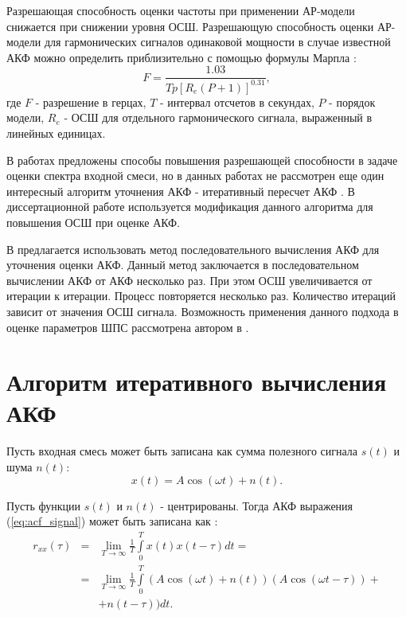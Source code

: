 Разрешающая способность оценки частоты при применении АР-модели снижается при снижении уровня ОСШ.
Разрешающую способность оценки АР-модели для гармонических сигналов
одинаковой мощности в случае известной АКФ можно определить приблизительно с помощью формулы Марпла \cite{marpl_book, kay_ar_book}:
\begin{equation}
	\label{eq:lpc_est_quality_1}
	F = \frac{1.03}{Tp[R_e(P+1)]^{0.31}},
\end{equation}
где ${F}$ - разрешение в герцах, ${T}$ - интервал отсчетов в секундах, ${P}$ - порядок модели, ${R_e}$ - ОСШ для отдельного гармонического сигнала, выраженный в линейных единицах.

В работах \cite{lacoss_spectral_est, chen_spectral_est, marple_1977} предложены способы повышения разрешающей способности в задаче оценки спектра входной смеси, но
в данных работах не рассмотрен еще один интересный алгоритм уточнения АКФ - итеративный пересчет АКФ \cite{ostanin_akf}. В диссертационной работе используется
модификация данного алгоритма для повышения ОСШ при оценке АКФ.

В \cite{ostanin_akf} предлагается использовать метод последовательного вычисления АКФ для уточнения оценки АКФ. Данный метод
заключается в последовательном вычислении АКФ от АКФ несколько раз. При этом ОСШ увеличивается от итерации к итерации.
Процесс повторяется несколько раз. Количество итераций зависит от значения ОСШ сигнала. Возможность применения данного подхода в оценке параметров ШПС рассмотрена
автором в \cite{my_acf_cdma}.

\section{Алгоритм итеративного вычисления АКФ}
\label{sec_ostanin}

Пусть входная смесь может быть записана как сумма полезного сигнала ${s(t)}$ и шума ${n(t)}$:
\begin{equation}
	\label{eq:acf_signal}
	x(t) = A \cos{(\omega t)} + n(t).
\end{equation}

Пусть функции ${s(t)}$ и ${n(t)}$ - центрированы. Тогда АКФ выражения (\ref{eq:acf_signal}) может быть записана как \cite{book_max}:
\begin{eqnarray}
	\label{eq:acf_rss_signal}
	r_{xx}(\tau)	& = & \lim_{T \to \infty} \frac{1}{T} \int \limits_0^T x(t)x(t-\tau)dt = \nonumber \\
			& = & \lim_{T \to \infty} \frac{1}{T} \int \limits_0^T (A \cos{(\omega t)} + n(t))(A \cos{(\omega t - \tau)}) + \\
			&   & + n(t - \tau))dt. \nonumber
\end{eqnarray}

